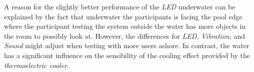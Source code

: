 A reason for the slightly better performance of the \emph{LED} underwater can be explained by the fact that underwater the participants is facing the pool edge where the participant testing the system outside the water has more objects in the room to possibly look at. 
However, the differences for \emph{LED}, \emph{Vibration}, and \emph{Sound} might adjust when testing with more users ashore.
In contrast, the water has a significant influence on the sensibility of the cooling effect provided by the \emph{thermoelectric cooler}.





























